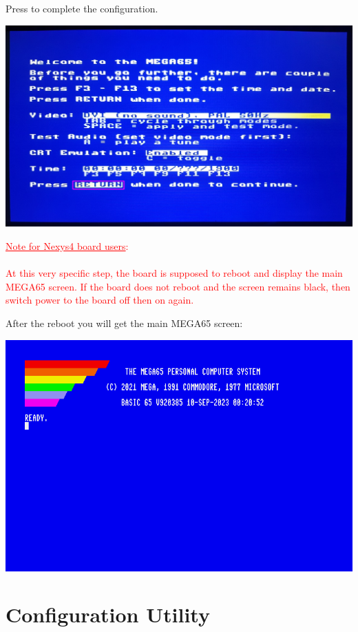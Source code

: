 Press  to complete the configuration.

\begin{center}
  \includegraphics[width=\linewidth]{images/img011_final_boot_05.png}
\end{center}

\ifdefined\printmanual
\else
\textcolor{red}{\underline{Note for Nexys4 board users}: \\
\\
  At this very specific step, the board is supposed to reboot and display the main MEGA65 screen. If the board does not reboot and the screen remains black, then switch power to the board off then on again.}
\fi

After the reboot you will get the main MEGA65 screen:

\begin{center}
  \includegraphics[width=0.9\linewidth]{images/img011_final_boot_06.png}
\end{center}

\section{Configuration Utility}

